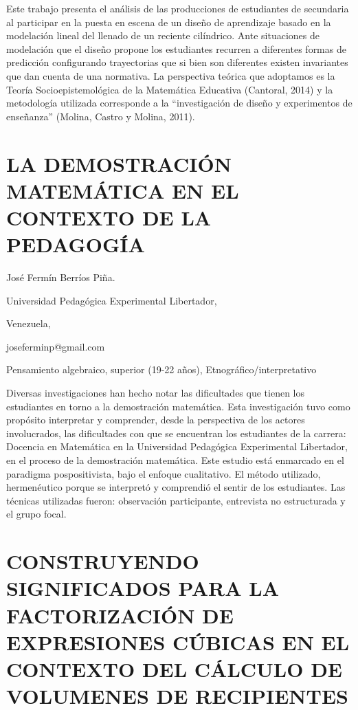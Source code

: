 Este trabajo presenta el análisis de las producciones de estudiantes
de secundaria al participar en la puesta en escena de un diseño de
aprendizaje basado en la modelación lineal del llenado de un reciente
cilíndrico. Ante situaciones de modelación que el diseño propone los
estudiantes recurren a diferentes formas de predicción configurando
trayectorias que si bien son diferentes existen invariantes que dan
cuenta de una normativa. La perspectiva teórica que adoptamos es la
Teoría Socioepistemológica de la Matemática Educativa (Cantoral, 2014)
y la metodología utilizada corresponde a la “investigación de diseño
y experimentos de enseñanza” (Molina, Castro y Molina, 2011). 


\section{LA DEMOSTRACIÓN MATEMÁTICA EN EL CONTEXTO DE LA PEDAGOGÍA}

\begin{datos}

José Fermín Berríos Piña.

Universidad Pedagógica Experimental Libertador,

Venezuela,

joseferminp@gmail.com

\end{datos}

Pensamiento algebraico, superior (19-22 años), Etnográfico/interpretativo

Diversas investigaciones han hecho notar las dificultades que tienen
los estudiantes en torno a la demostración matemática. Esta investigación
tuvo como propósito interpretar y comprender, desde la perspectiva
de los actores involucrados, las dificultades con que se encuentran
los estudiantes de la carrera: Docencia en Matemática en la Universidad
Pedagógica Experimental Libertador, en el proceso de la demostración
matemática. Este estudio está enmarcado en el paradigma pospositivista,
bajo el enfoque cualitativo. El método utilizado, hermenéutico porque
se interpretó y comprendió el sentir de los estudiantes. Las técnicas
utilizadas fueron: observación participante, entrevista no estructurada
y el grupo focal. 


\section{CONSTRUYENDO SIGNIFICADOS PARA LA FACTORIZACIÓN DE EXPRESIONES CÚBICAS
EN EL CONTEXTO DEL CÁLCULO DE VOLUMENES DE RECIPIENTES}

